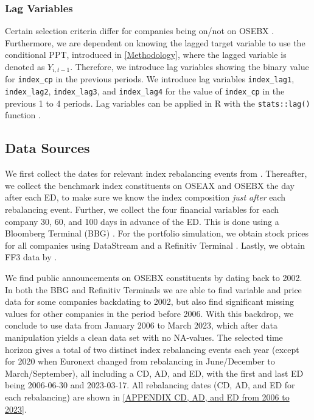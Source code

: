 \subsubsection{Lag Variables}

 Certain selection criteria differ for companies being on/not on OSEBX \parencite{OSEBX-rule-book}. Furthermore, we are dependent on knowing the lagged target variable to use the conditional PPT, introduced in \autoref{Methodology}, where the lagged variable is denoted as $Y_{i, t-1}$. Therefore, we introduce lag variables showing the binary value for \texttt{index\_cp} in the previous periods. We introduce lag variables \texttt{index\_lag1}, \texttt{index\_lag2}, \texttt{index\_lag3}, and \texttt{index\_lag4} for the value of \texttt{index\_cp} in the previous 1 to 4 periods. Lag variables can be applied in R with the \texttt{stats::lag()} function \parencite{lag-variable-R}. 


\subsection{Data Sources}

We first collect the dates for relevant index rebalancing events from \textcite{oslo-stock-exchange-news-web}. Thereafter, we collect the benchmark index constituents on OSEAX and OSEBX the day after each ED, to make sure we know the index composition \textit{just after} each rebalancing event. Further, we collect the four financial variables for each company 30, 60, and 100 days in advance of the ED. This is done using a Bloomberg Terminal (BBG) \parencite{bloomberg-terminal}. For the portfolio simulation, we obtain stock prices for all companies using DataStream and a Refinitiv Terminal \parencite{nhh-data-stream}. Lastly, we obtain FF3 data by \textcite{bernt-fama-french}. 

We find public announcements on OSEBX constituents by \textcite{oslo-stock-exchange-news-web} dating back to 2002. In both the BBG and Refinitiv Terminals we are able to find variable and price data for some companies backdating to 2002, but also find significant missing values for other companies in the period before 2006. With this backdrop, we conclude to use data from January 2006 to March 2023, which after data manipulation yields a clean data set with no NA-values. The selected time horizon gives a total of two distinct index rebalancing events each year (except for 2020 when Euronext changed from rebalancing in June/December to March/September), all including a CD, AD, and ED, with the first and last ED being 2006-06-30 and 2023-03-17. All rebalancing dates (CD, AD, and ED for each rebalancing) are shown in \autoref{APPENDIX CD, AD, and ED from 2006 to 2023}.

